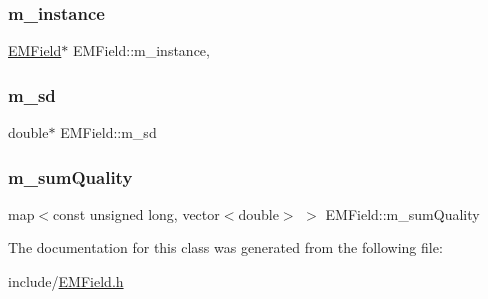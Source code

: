 \mbox{\label{class_e_m_field_a3a75e412fa15cfab78ce64dfbb8af52d}} 
\subsubsection{\texorpdfstring{m\+\_\+instance}{m\_instance}}
{\footnotesize\ttfamily \hyperlink{class_e_m_field}{E\+M\+Field}$\ast$ E\+M\+Field\+::m\+\_\+instance\hspace{0.3cm}{\ttfamily [static]}, {\ttfamily [private]}}

\mbox{\label{class_e_m_field_ac2142eafd5b82e43437a8047565f619c}} 
\subsubsection{\texorpdfstring{m\+\_\+sd}{m\_sd}}
{\footnotesize\ttfamily double$\ast$ E\+M\+Field\+::m\+\_\+sd\hspace{0.3cm}{\ttfamily [private]}}

\mbox{\label{class_e_m_field_a18e5a4d972d888c5da458e30e426c7ae}} 
\subsubsection{\texorpdfstring{m\+\_\+sum\+Quality}{m\_sumQuality}}
{\footnotesize\ttfamily map$<$const unsigned long, vector$<$double$>$ $>$ E\+M\+Field\+::m\+\_\+sum\+Quality\hspace{0.3cm}{\ttfamily [private]}}



The documentation for this class was generated from the following file\+:\begin{DoxyCompactItemize}
\item 
include/\hyperlink{_e_m_field_8h}{E\+M\+Field.\+h}\end{DoxyCompactItemize}
